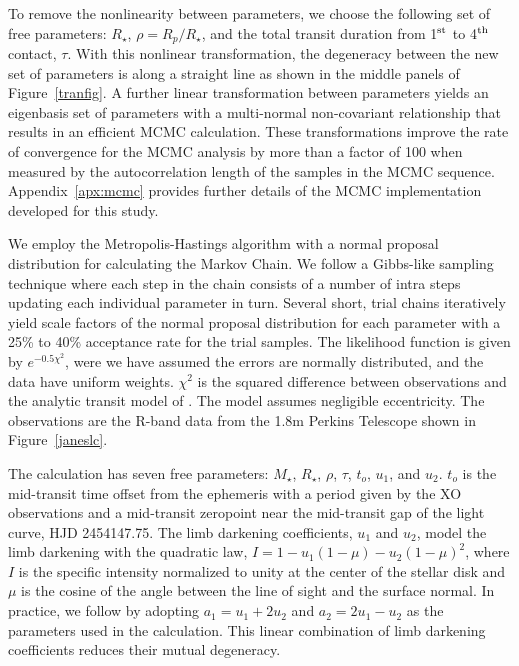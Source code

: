 \documentclass{emulateapj}
\begin{document}
To remove the nonlinearity between parameters, we choose the following
set of free parameters: $R_{\star}$, $\rho=R_{p}/R_{\star}$, and the
total transit duration from 1$^{\rm st}$ to 4$^{\rm th}$ contact,
$\tau$.  With this nonlinear transformation, the degeneracy between
the new set of parameters is along a straight line as shown in the
middle panels of Figure~\ref{tranfig}.  A further linear
transformation between parameters yields an eigenbasis set of
parameters with a multi-normal non-covariant relationship that results
in an efficient MCMC calculation.  These transformations improve the
rate of convergence for the MCMC analysis by more than a factor of 100
when measured by the autocorrelation length of the samples in the MCMC
sequence.  Appendix~\ref{apx:mcmc} provides further details of the
MCMC implementation developed for this study.

We employ the Metropolis-Hastings algorithm with a normal proposal
distribution for calculating the Markov Chain.  We follow a Gibbs-like
sampling technique where each step in the chain consists of a number
of intra steps updating each individual parameter in turn.  Several
short, trial chains iteratively yield scale factors of the normal
proposal distribution for each parameter with a 25\% to 40\%
acceptance rate for the trial samples.  The likelihood function is
given by $e^{-0.5\chi^{2}}$, were we have assumed the errors are
normally distributed, and the data have uniform weights.  $\chi^{2}$
is the squared difference between observations and the analytic
transit model of \citet{MAN02}.  The model assumes negligible
eccentricity.  The observations are the R-band data from the 1.8m
Perkins Telescope shown in Figure~\ref{janeslc}.

The calculation has seven free parameters: $M_{\star}$, $R_{\star}$,
$\rho$, $\tau$, $t_{o}$, $u_{1}$, and $u_{2}$.  $t_{o}$ is the
mid-transit time offset from the ephemeris with a period given by the
XO observations and a mid-transit zeropoint near the mid-transit gap
of the light curve, HJD 2454147.75.  The limb darkening coefficients,
$u_{1}$ and $u_{2}$, model the limb darkening with the quadratic law,
$I=1-u_{1}(1-\mu)-u_{2}(1-\mu)^{2}$, where $I$ is the specific
intensity normalized to unity at the center of the stellar disk and
$\mu$ is the cosine of the angle between the line of sight and the
surface normal.  In practice, we follow \citet{HOL06} by adopting
$a_{1}=u_{1}+2u_{2}$ and $a_{2}=2u_{1}-u_{2}$ as the parameters used
in the calculation.  This linear combination of limb darkening
coefficients reduces their mutual degeneracy.
\end{document}
